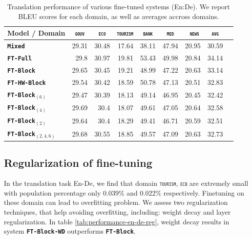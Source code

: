 \documentclass[11pt,a4paper]{article}
\newcommand{\fyTodo}[1]{\Todo[FY:]{\textcolor{orange}{#1}}}
\newcommand{\fyDone}[1]{\done[FY]\Todo[FY:]{\textcolor{orange}{#1}}}
\newcommand{\domain}[1]{\texttt{\textsc{#1}}}
\newcommand{\system}[1]{\texttt{\textbf{#1}}}
\begin{document}
\begin{table}[htbp]
  \centering
  \fyDone{Fix column size}
  \begin{tabular}{|p{3cm}|*{8}{r|}} \hline
    Model / Domain & \multicolumn{1}{c|}{\domain{gouv}} & \multicolumn{1}{c|}{\domain{eco}} & \multicolumn{1}{c|}{\domain{tourism}} & \multicolumn{1}{c|}{\domain{bank}} & \multicolumn{1}{c|}{\domain{ med }} & \multicolumn{1}{c|}{\domain{ news}} & \multicolumn{1}{c|}{\domain{avg}} \\ \hline %
    \system{Mixed}  & 29.31 & 30.48 & 17.64 & 38.11 & 47.94 & 20.95  & 30.59 \\
    \system{FT-Full}       & 29.8 & 30.97 & 19.81 & 53.43 & 49.98 & 20.84 & 34.14 \\
   \system{FT-Block}     & 29.65 & 30.45 & 19.21 & 48.99 & 47.22 & 20.63 & 33.14 \\ 
   \system{FT-HW-Block}   & 29.54 & 30.42 & 18.59 & 50.78 & 47.13 & 20.51 & 32.83 \\ 
   \system{FT-Block$_{(6)}$}     & 29.47 & 30.39 & 18.13 & 49.14 & 46.95 & 20.45 & 32.42 \\
   \system{FT-Block$_{(4)}$}     & 29.69 & 30.4 & 18.07 & 49.61 & 47.05 & 20.64 & 32.58 \\
   \system{FT-Block$_{(2)}$}   & 29.64 & 30.4 & 18.29 & 49.41 & 46.71 & 20.59 & 32.51  \\
   \system{FT-Block$_{(2,4,6)}$}  & 29.68  & 30.55 & 18.85 & 49.57 & 47.09 & 20.63 &  32.73  \\
     \hline
  \end{tabular}
  \caption{Translation performance of various fine-tuned systems (En:De). We report BLEU scores for each domain, as well as averages accross domains.}
  \label{tab:performance-en-de}
\end{table}

\fyTodo{Why HW worse than standard version ?} \fyTodo{Why is regularization not helping ? It helps for small domain - domain specific regularization ??}

\subsection{Regularization of fine-tuning}
In the translation task En-De, we find that domain \domain{tourism}, \domain{ecb} are extremely small with population percentage only 0.039\% and 0.022\% respectively. Finetuning on these domain can lead to overfitting problem. We assess two regularization techniques, that help avoiding overfitting, including: weight decay and layer regularization. In table \ref{tab:performance-en-de-reg}, weight decay results in system \system{FT-Block-WD} outperforms \system{FT-Block}. \fyTodo{How is weight decay ?}
\end{document}
